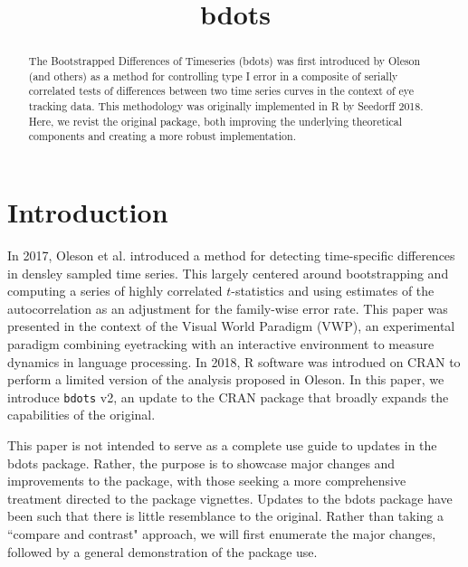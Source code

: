 \documentclass{article}
\title{bdots}
\date{}
\begin{document}

\maketitle

%

\begin{abstract}
The Bootstrapped Differences of Timeseries (bdots) was first introduced by Oleson (and others) as a method for controlling type I error in a composite of serially correlated tests of differences between two time series curves in the context of eye tracking data.  This methodology was originally implemented in R by Seedorff 2018. Here, we revist the original package, both improving the underlying theoretical components and creating a more robust implementation.
\end{abstract}

\section{Introduction}

In 2017, Oleson et al. introduced a method for detecting time-specific differences in densley sampled time series. This largely centered around bootstrapping and computing a series of highly correlated $t$-statistics and using estimates of the autocorrelation as an adjustment for the family-wise error rate. This paper was presented in the context of the Visual World Paradigm (VWP), an experimental paradigm combining eyetracking with an interactive environment to measure dynamics in language processing. In 2018, R software was introdued on CRAN to perform a limited version of the analysis proposed in Oleson. In this paper, we introduce \texttt{bdots} v2, an update to the CRAN package that broadly expands the capabilities of the original. 

This paper is not intended to serve as a complete use guide to updates in the bdots package. Rather, the purpose is to showcase major changes and improvements to the package, with those seeking a more comprehensive treatment directed to the package vignettes. Updates to the bdots package have been such that there is little resemblance to the original. Rather than taking a ``compare and contrast" approach, we will first enumerate the major changes, followed by a general demonstration of the package use. 
\end{document}
